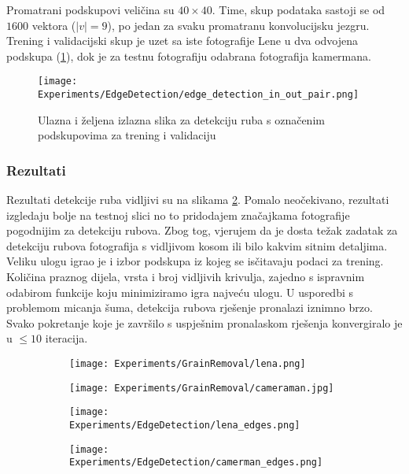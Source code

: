 Promatrani podskupovi veličina su $40 \times 40$.
Time, skup podataka sastoji se od $1600$ vektora ($|v| = 9$), po jedan za svaku promatranu konvolucijsku jezgru.
Trening i validacijski skup je uzet sa iste fotografije Lene u dva odvojena podskupa (\ref{fig:edge_detection_in_out_pair_example}), dok je za testnu fotografiju odabrana fotografija kamermana.

\begin{figure}
	\centering
	\texttt{[image: Experiments/EdgeDetection/edge\_detection\_in\_out\_pair.png]}
	\caption{Ulazna i željena izlazna slika za detekciju ruba s označenim podskupovima za trening i validaciju}
	\label{fig:edge_detection_in_out_pair_example}
\end{figure}

\subsubsection{Rezultati}
Rezultati detekcije ruba vidljivi su na slikama \ref{fig:edge_detection_results}. %
Pomalo neočekivano, rezultati izgledaju bolje na testnoj slici no to pridodajem značajkama fotografije pogodnijim za detekciju rubova.
Zbog tog, vjerujem da je dosta težak zadatak za detekciju rubova fotografija s vidljivom kosom ili bilo kakvim sitnim detaljima.
Veliku ulogu igrao je i izbor podskupa iz kojeg se isčitavaju podaci za trening.
Količina praznog dijela, vrsta i broj vidljivih krivulja, zajedno s ispravnim odabirom funkcije koju minimiziramo igra najveću ulogu.
U usporedbi s problemom micanja šuma, detekcija rubova rješenje pronalazi iznimno brzo.
Svako pokretanje koje je završilo s uspješnim pronalaskom rješenja konvergiralo je u $\leq 10$ iteracija.

\begin{figure}
	\centering
	\caption{Fotografije Lene i Kamermana prije i nakon detekcije rubova}
	\begin{subfigure}[t]{0.48\textwidth}
		\texttt{[image: Experiments/GrainRemoval/lena.png]}
	\end{subfigure}
	\begin{subfigure}[t]{0.48\textwidth}
		\texttt{[image: Experiments/GrainRemoval/cameraman.jpg]}
	\end{subfigure}
	\begin{subfigure}[t]{0.48\textwidth}
		\texttt{[image: Experiments/EdgeDetection/lena\_edges.png]}
	\end{subfigure}
	\begin{subfigure}[t]{0.48\textwidth}
		\texttt{[image: Experiments/EdgeDetection/camerman\_edges.png]}
	\end{subfigure}
	\label{fig:edge_detection_results}
\end{figure}

